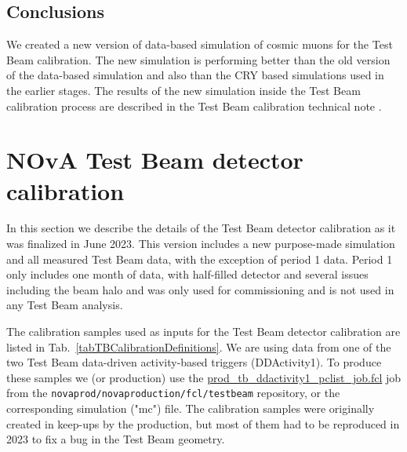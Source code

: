 \subsection{Conclusions}
We created a new version of data-based simulation of cosmic muons for the Test Beam calibration. The new simulation is performing better than the old version of the data-based simulation and also than the CRY based simulations used in the earlier stages. The results of the new simulation inside the Test Beam calibration process are described in the Test Beam calibration technical note \cite{NOVA-doc-60592}.

\section{NOvA Test Beam detector calibration}
In this section we describe the details of the Test Beam detector calibration as it was finalized in June 2023. This version includes a new purpose-made simulation and all measured Test Beam data, with the exception of period 1 data. Period 1 only includes one month of data, with half-filled detector and several issues including the beam halo \cite{NOVA-doc-41331} and was only used for commissioning and is not used in any Test Beam analysis. 



The calibration samples used as inputs for the Test Beam detector calibration are listed in Tab.~\ref{tabTBCalibrationDefinitions}. We are using data from one of the two Test Beam data-driven activity-based triggers (DDActivity1). To produce these samples we (or production) use the 
\href{https://github.com/novaexperiment/novaprod/blob/main/novaproduction/fcl/testbeam/prod\_tb\_ddactivity1\_pclist\_job.fcl}{prod\_tb\_ddactivity1\_pclist\_job.fcl} job from the \texttt{novaprod/novaproduction/fcl/testbeam} repository, or the corresponding simulation ("mc") file. The calibration samples were originally created in keep-ups by the production, but most of them had to be reproduced in 2023 to fix a bug in the Test Beam geometry.

